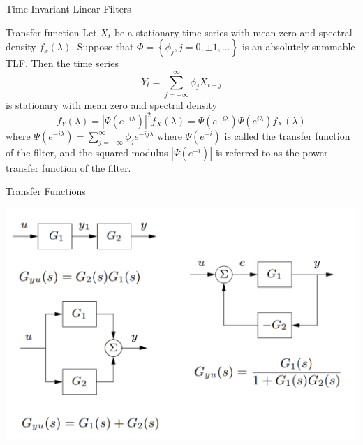 \documentclass[11pt]{beamer}
\begin{document}
\begin{frame}{Time-Invariant Linear Filters \cite{brockwell2002introduction}}
\begin{alertblock}{Transfer function}
Let ${X_{t}}$ be a stationary time series with mean zero and spectral density $f_{x}(\lambda)$. Suppose that $\Phi=\left\lbrace \phi_{j},j=0,\pm 1,... \right\rbrace$ is an absolutely summable TLF. Then the time series 
\begin{equation*}
Y_{t}=\sum_{j=-\infty}^{\infty}\phi_{j}X_{t-j}
\end{equation*}
is stationary with mean zero and spectral density 
\begin{equation*}
f_{Y}(\lambda)=|\Psi(e^{-i\lambda})|^{2}f_{X}(\lambda)=\Psi(e^{-i\lambda})\Psi(e^{i\lambda})f_{X}(\lambda)
\end{equation*}
where $\Psi(e^{-i\lambda})=\sum^{\infty}_{j=-\infty}\phi_{j}e^{-ij\lambda}$ where  $\Psi(e^{-i})$ is called the transfer function of the filter, and the squared modulus $|\Psi(e^{-i})|$ is referred to as the power transfer function of the filter. 
\end{alertblock}
\end{frame}


\begin{frame}{Transfer Functions \cite{aastrom2021feedback}}
    \begin{center}
     \includegraphics[width=\textwidth]{Pic/Funzioni_di_trasferimento.png}
    \end{center}
\end{frame}
\end{document}
